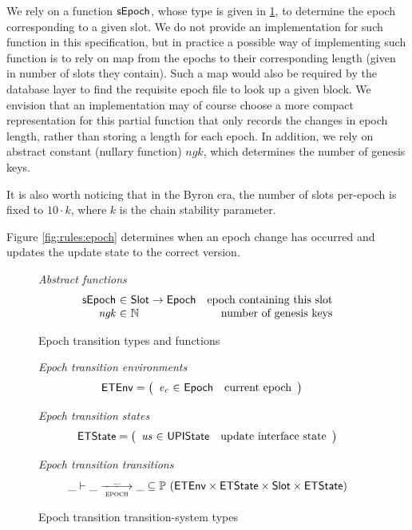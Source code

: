 \documentclass[11pt,a4paper]{article}
\newcommand{\powerset}[1]{\mathbb{P}~#1}
\newcommand{\var}[1]{\mathit{#1}}
\newcommand{\fun}[1]{\mathsf{#1}}
\newcommand{\type}[1]{\mathsf{#1}}
\newcommand{\trans}[2]{\xlongrightarrow[\textsc{#1}]{#2}}
\newcommand{\totalf}{\to}
\newcommand{\Slot}{\type{Slot}}
\begin{document}
We rely on a function $\fun{\sepochname}$, whose type is given in
\cref{fig:defs:epoch}, to determine the epoch corresponding to a given slot.
%
We do not provide an implementation for such function in this specification,
but in practice a possible way of implementing such function is to rely on map
from the epochs to their corresponding length (given in number of slots they
contain). Such a map would also be required by the database layer to find the
requisite epoch file to look up a given block. We envision that an
implementation may of course choose a more compact representation for this
partial function that only records the changes in epoch length, rather than
storing a length for each epoch.
%
In addition, we rely on abstract constant (nullary function) $\var{ngk}$, which
determines the number of genesis keys.

It is also worth noticing that in the Byron era, the number of slots per-epoch
is fixed to $10 \cdot k$, where $k$ is the chain stability parameter.

Figure \ref{fig:rules:epoch} determines when an epoch change has occurred and
updates the update state to the correct version.

\begin{figure}[ht]
  \emph{Abstract functions}
  \begin{equation*}
    \begin{array}{r@{~\in~}lr}
      \fun{\sepochname}
      & \Slot \totalf \Epoch
      & \text{epoch containing this slot} \\
      \var{ngk} & \mathbb{N} & \text{number of genesis keys}\\
    \end{array}
  \end{equation*}

  \caption{Epoch transition types and functions}
  \label{fig:defs:epoch}
\end{figure}

\begin{figure}[ht]
  \emph{Epoch transition environments}
  \begin{align*}
    & \ETEnv
      = \left(
          \begin{array}{r@{~\in~}lr}
            \var{e_c} & \Epoch & \text{current epoch}
          \end{array}\right)
  \end{align*}

  \emph{Epoch transition states}
  \begin{equation*}
    \ETState =
    \left(
      \begin{array}{r@{~\in~}lr}
        \var{us} & \UPIState & \text{update interface state}
      \end{array}
    \right)
  \end{equation*}

  \emph{Epoch transition transitions}
  \begin{equation*}
    \_ \vdash \var{\_} \trans{epoch}{\_} \var{\_} \subseteq
    \powerset (\ETEnv \times \ETState \times \Slot \times \ETState)
  \end{equation*}
  \caption{Epoch transition transition-system types}
  \label{fig:ts-types:epoch}
\end{figure}
\end{document}
